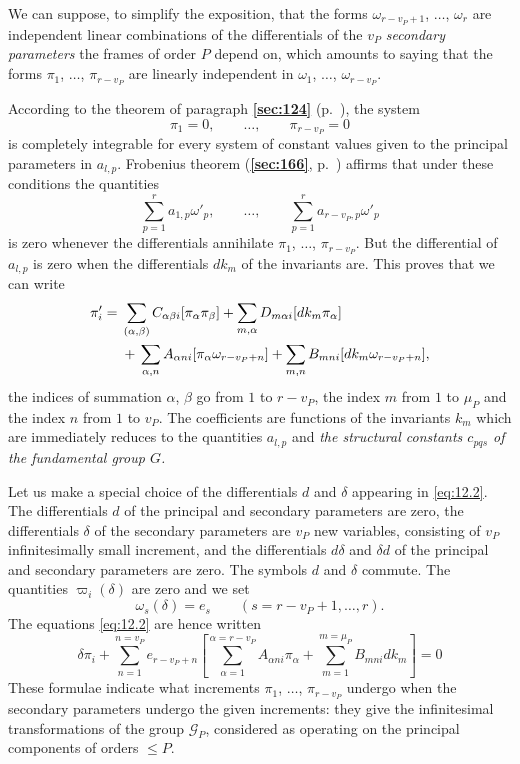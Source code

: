 \documentclass[leqno,11pt]{book}
\numberwithin{equation}{chapter}
\theoremstyle{shape1}
\theoremstyle{shapesmall}
\newcommand{\fsref}[1]{{\rm\textsection\textbf{\ref{sec:#1}}}}
\newcommand{\vp}{\varpi}
\begin{document}
We can suppose, to simplify the exposition, that the forms $\omega_{r-v_{P}+1}$, $\dots$, $\omega_{r}$ are independent linear combinations of the differentials of the $v_{P}$ \emph{secondary parameters} the frames of order $P$ depend on, which amounts to saying that the forms $\pi_{1}$, $\dots$, $\pi_{r-v_{P}}$ are linearly independent in $\omega_{1}$, $\dots$, $\omega_{r-v_{P}}$.

According to the theorem of paragraph \fsref{124} (p.~\pageref{sec:124}), the system
\[
\pi_{1}=0,\qquad\dots,\qquad\pi_{r-v_{P}}=0
\]
is completely integrable for every system of constant values given to the principal parameters in $a_{l,p}$. Frobenius theorem (\fsref{166}, p.~\pageref{sec:166}) affirms that under these conditions the quantities
\[
\sum_{p=1}^{r}a_{1,p}\omega'_{p},\qquad\dots,\qquad
\sum_{p=1}^{r}a_{r-v_{P},p}\omega'_{p}
\]
is zero whenever the differentials annihilate $\pi_{1}$, $\dots$, $\pi_{r-v_{P}}$. But the differential of $a_{l,p}$ is zero when the differentials $dk_{m}$ of the invariants are. This proves that we can write
\begin{align}
  \label{eq:12.2}
  \pi'_{i}{}={}&{}\sum_{(\alpha,\beta)}C_{\alpha\beta i}[\pi_{\alpha}\pi_{\beta}]+\sum_{m,\alpha}D_{m\alpha i}[dk_{m}\pi_{\alpha}]\\
  &{}+{}\sum_{\alpha,n}A_{\alpha ni}[\pi_{\alpha}\omega_{r-v_{P}+n}]+\sum_{m,n}B_{mni}[dk_{m}\omega_{r-v_{P}+n}],\notag
\end{align}
the indices of summation $\alpha$, $\beta$ go from $1$ to $r-v_{P}$, the index $m$ from $1$ to $\mu_{P}$ and the index $n$ from $1$ to $v_{P}$. The coefficients are functions of the invariants $k_{m}$ which are immediately reduces to the quantities $a_{l,p}$ and \emph{the structural constants $c_{pqs}$ of the fundamental group $G$.}

Let us make a special choice of the differentials $d$ and $\delta$ appearing in \eqref{eq:12.2}. The differentials $d$ of the principal and secondary parameters are zero, the differentials $\delta$ of the secondary parameters are $v_{P}$ new variables, consisting of $v_{P}$ infinitesimally small increment, and the differentials $d\delta$ and $\delta d$ of the principal and secondary parameters are zero. The symbols $d$ and $\delta$ commute. The quantities $\vp_{i}(\delta)$ are zero and we set
\[
\omega_{s}(\delta)=e_{s}\qquad(s=r-v_{P}+1,\dots,r).
\]
The equations \eqref{eq:12.2} are hence written
\begin{equation}
  \label{eq:12.3}
  \delta \pi_{i}+\sum_{n=1}^{n=v_{P}}e_{r-v_{P}+n}\left[\sum_{\alpha=1}^{\alpha=r-v_{P}}A_{\alpha ni}\pi_{\alpha}+\sum_{m=1}^{m=\mu_{P}}B_{mni}dk_{m}\right]=0
\end{equation}
These formulae indicate what increments $\pi_{1}$, $\dots$, $\pi_{r-v_{P}}$ undergo when the secondary parameters undergo the given increments: they give the infinitesimal transformations of the group $\mathcal{G}_{P}$, considered as operating on the principal components of orders $\le P$.
\end{document}
